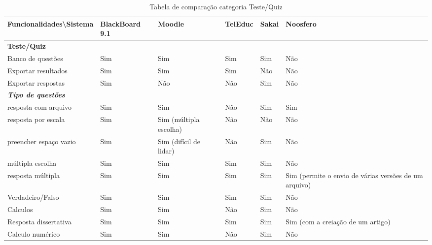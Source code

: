\begin{landscape}
\begin{table}[H]
\begin{tabular}{|@{}p{5.5cm}|p{3.5cm}|p{3.5cm}|p{3.5cm}|p{3.5cm}|p{3.5cm}@{}|}
\hline
\textbf{Funcionalidades\textbackslash Sistema} & \textbf{BlackBoard 9.1} & \textbf{Moodle} & \textbf{TelEduc} & \textbf{Sakai} & \textbf{Noosfero}\\ \hline
\textbf{Teste/Quiz} &  &  &  &  &  \\
Banco de questões & Sim & Sim & Sim & Sim & Não \\
Exportar resultados & Sim & Sim & Sim & Não & Não \\
Exportar respostas & Sim & Não & Não & Sim & Não \\
\textit{\textbf{Tipo de questões}} &  &  &  &  &  \\
resposta com arquivo & Sim & Sim & Não & Sim & Sim \\
resposta por escala & Sim & Sim {\tiny (múltipla escolha)} & Não & Não & Não \\
preencher espaço vazio & Sim & Sim {\tiny (difícil de lidar)} & Não & Sim & Não \\
múltipla escolha & Sim & Sim & Sim & Sim & Não \\
resposta múltipla & Sim & Sim & Sim & Sim & Sim {\tiny(permite o envio de várias versões de um arquivo)} \\
Verdadeiro/Falso & Sim & Sim & Sim & Sim & Não \\
Calculos & Sim & Sim & Não & Sim & Não \\
Resposta dissertativa & Sim & Sim & Sim & Sim & Sim {\tiny (com a creiação de um artigo)} \\
Calculo numérico & Sim & Sim & Não & Sim & Não \\ \hline
\end{tabular}
\caption{Tabela de comparação categoria Teste/Quiz}
\label{tab:teste}
\end{table}


\end{landscape}
